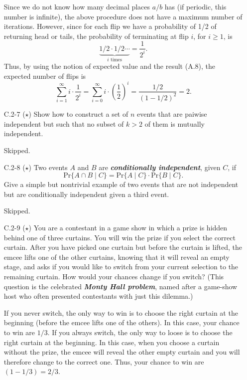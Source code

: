 \begin{enumerate}
\begin{framed}
Since we do not know how many decimal places $a/b$ has (if periodic, this number
is infinite), the above procedure does not have a maximum number of iterations.
However, since for each flip we have a probability of 1/2 of returning head or
tails, the probability of terminating at flip $i$, for $i \ge 1$, is
\[
  \underbrace{1/2 \cdot 1/2 \cdots}_\text{$i$ times} = \frac{1}{2^i}.
\]
Thus, by using the notion of expected value and the result (A.8), the expected number of
flips is
\[
  \sum_{i = 1}^{\infty} i \cdot \frac{1}{2^i}
  = \sum_{i = 0}^{\infty} i \cdot \left(\frac{1}{2}\right)^{i}
  = \frac{1/2}{(1 - 1/2)^2} = 2.
\]

\end{framed}

\item[C.2{-}7] {($\star$) Show how to construct a set of $n$ events that are
  paiwise independent but such that no subset of $k > 2$ of them is mutually
  independent.}

\begin{framed}
Skipped.
\end{framed}

\item[C.2{-}8] {($\star$) Two events $A$ and $B$ are \textbf{\emph{conditionally
  independent}}, given $C$, if
  \[
    \text{Pr}\{A \cap B\;|\;C\} = \text{Pr}\{A\;|\;C\} \cdot \text{Pr}\{B\;|\;C\}.
  \]
  Give a simple but nontrivial example of two events that are not independent
  but are conditionally independent given a third event.
}

\begin{framed}
Skipped.
\end{framed}

\newpage

\item[C.2{-}9] {($\star$) You are a contestant in a game show in which a prize
  is hidden behind one of three curtains. You will win the prize if you select
  the correct curtain. After you have picked one curtain but before the curtain
  is lifted, the emcee lifts one of the other curtains, knowing that it will
  reveal an empty stage, and asks if you would like to switch from your current
  selection to the remaining curtain. How would your chances change if you
  switch? (This question is the celebrated \textbf{\emph{Monty Hall problem}},
  named after a game-show host who often presented contestants with just this
  dilemma.)}

\begin{framed}
If you never switch, the only way to win is to choose the right curtain at the
beginning (before the emcee lifts one of the others). In this case, your chance
to win are $1/3$. If you always switch, the only way to loose is to choose the
right curtain at the beginning. In this case, when you choose a curtain without
the prize, the emcee will reveal the other empty curtain and you will
therefore change to the correct one. Thus, your chance to win are $(1
- 1/3) = 2/3$.
\end{framed}


\end{enumerate}
